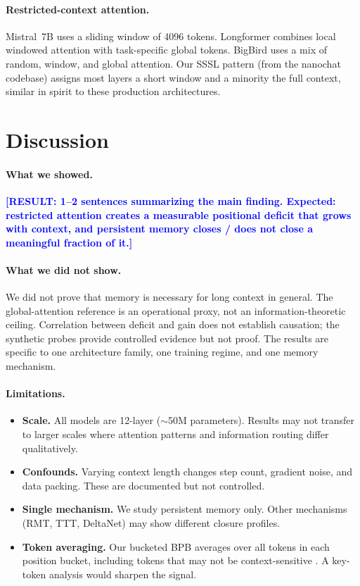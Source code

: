 \documentclass[11pt]{article}
\newcommand{\result}[1]{\textcolor{blue}{\textbf{[RESULT: #1]}}}
\begin{document}
\paragraph{Restricted-context attention.}
Mistral~7B \citep{jiang2023mistral} uses a sliding window of 4096
tokens. Longformer \citep{beltagy2020longformer} combines local
windowed attention with task-specific global tokens.
BigBird \citep{zaheer2020bigbird} uses a mix of random, window,
and global attention. Our SSSL pattern (from the nanochat codebase)
assigns most layers a short window and a minority the full context,
similar in spirit to these production architectures.


\section{Discussion}
\label{sec:discussion}

\paragraph{What we showed.}
\result{1--2 sentences summarizing the main finding.
Expected: restricted attention creates a measurable positional
deficit that grows with context, and persistent memory
closes / does not close a meaningful fraction of it.}

\paragraph{What we did not show.}
We did not prove that memory is necessary for long context in general.
The global-attention reference is an operational proxy, not an
information-theoretic ceiling. Correlation between deficit and gain
does not establish causation; the synthetic probes provide controlled
evidence but not proof. The results are specific to one architecture
family, one training regime, and one memory mechanism.

\paragraph{Limitations.}
\begin{itemize}
\item \textbf{Scale.} All models are 12-layer ($\sim$50M parameters).
  Results may not transfer to larger scales where attention patterns
  and information routing differ qualitatively.
\item \textbf{Confounds.} Varying context length changes step count,
  gradient noise, and data packing. These are documented but not
  controlled.
\item \textbf{Single mechanism.} We study persistent memory only.
  Other mechanisms (RMT, TTT, DeltaNet) may show different
  closure profiles.
\item \textbf{Token averaging.} Our bucketed BPB averages over all
  tokens in each position bucket, including tokens that may not be
  context-sensitive \citep{fang2025longppl}. A key-token analysis
  would sharpen the signal.
\end{itemize}
\end{document}
